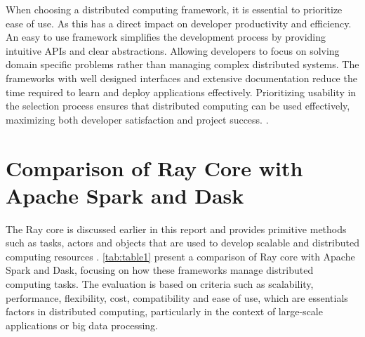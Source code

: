 When choosing a distributed computing framework, it is essential to prioritize ease of use. As this has a direct impact on developer productivity and efficiency. An easy to use framework simplifies the development process by providing intuitive APIs and clear abstractions. Allowing developers to focus on solving domain specific problems rather than managing complex distributed systems. The frameworks with well designed interfaces and extensive documentation reduce the time required to learn and deploy applications effectively. Prioritizing usability in the selection process ensures that distributed computing can be used effectively, maximizing both developer satisfaction and project success. \cite{zaharia2012resilient}.



\section{Comparison of Ray Core with Apache Spark and Dask}


The Ray core is discussed earlier in this report and provides primitive methods such as tasks, actors and objects that are used to develop scalable and distributed computing resources \cite{ray_doc}. \autoref{tab:table1} present a comparison of Ray core with Apache Spark and Dask, focusing on how these frameworks manage distributed computing tasks. The evaluation is based on criteria such as scalability, performance, flexibility, cost, compatibility and ease of use, which are essentials factors in distributed computing, particularly in the context of large-scale applications or big data processing.


